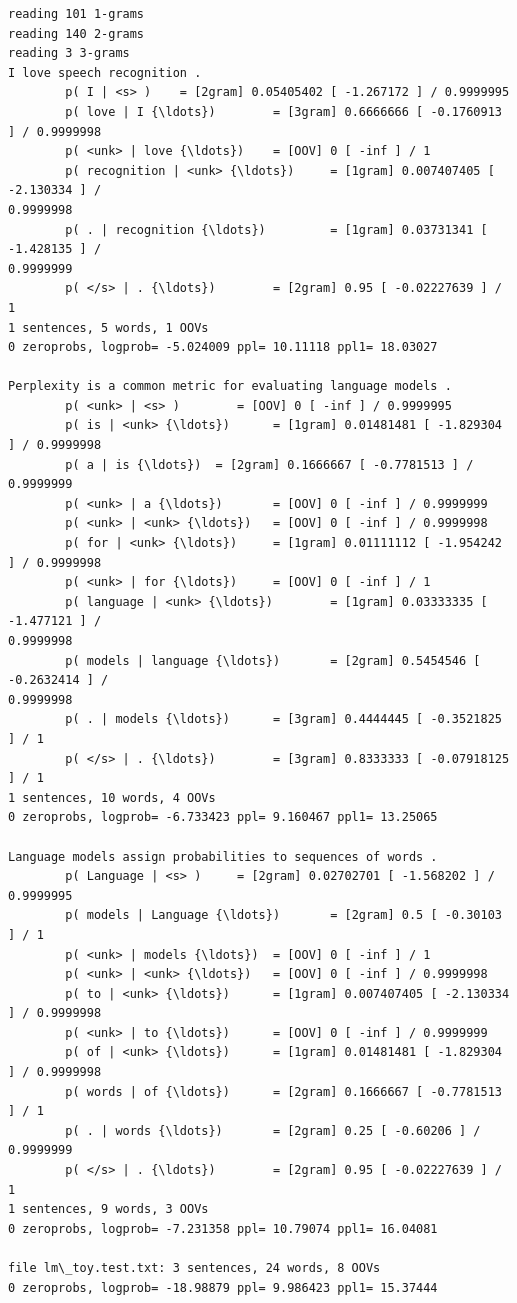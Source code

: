 \documentclass[11pt]{article}
\begin{document}
    \begin{Verbatim}[commandchars=\\\{\}]
reading 101 1-grams
reading 140 2-grams
reading 3 3-grams
I love speech recognition .
        p( I | <s> )    = [2gram] 0.05405402 [ -1.267172 ] / 0.9999995
        p( love | I {\ldots})        = [3gram] 0.6666666 [ -0.1760913 ] / 0.9999998
        p( <unk> | love {\ldots})    = [OOV] 0 [ -inf ] / 1
        p( recognition | <unk> {\ldots})     = [1gram] 0.007407405 [ -2.130334 ] /
0.9999998
        p( . | recognition {\ldots})         = [1gram] 0.03731341 [ -1.428135 ] /
0.9999999
        p( </s> | . {\ldots})        = [2gram] 0.95 [ -0.02227639 ] / 1
1 sentences, 5 words, 1 OOVs
0 zeroprobs, logprob= -5.024009 ppl= 10.11118 ppl1= 18.03027

Perplexity is a common metric for evaluating language models .
        p( <unk> | <s> )        = [OOV] 0 [ -inf ] / 0.9999995
        p( is | <unk> {\ldots})      = [1gram] 0.01481481 [ -1.829304 ] / 0.9999998
        p( a | is {\ldots})  = [2gram] 0.1666667 [ -0.7781513 ] / 0.9999999
        p( <unk> | a {\ldots})       = [OOV] 0 [ -inf ] / 0.9999999
        p( <unk> | <unk> {\ldots})   = [OOV] 0 [ -inf ] / 0.9999998
        p( for | <unk> {\ldots})     = [1gram] 0.01111112 [ -1.954242 ] / 0.9999998
        p( <unk> | for {\ldots})     = [OOV] 0 [ -inf ] / 1
        p( language | <unk> {\ldots})        = [1gram] 0.03333335 [ -1.477121 ] /
0.9999998
        p( models | language {\ldots})       = [2gram] 0.5454546 [ -0.2632414 ] /
0.9999998
        p( . | models {\ldots})      = [3gram] 0.4444445 [ -0.3521825 ] / 1
        p( </s> | . {\ldots})        = [3gram] 0.8333333 [ -0.07918125 ] / 1
1 sentences, 10 words, 4 OOVs
0 zeroprobs, logprob= -6.733423 ppl= 9.160467 ppl1= 13.25065

Language models assign probabilities to sequences of words .
        p( Language | <s> )     = [2gram] 0.02702701 [ -1.568202 ] / 0.9999995
        p( models | Language {\ldots})       = [2gram] 0.5 [ -0.30103 ] / 1
        p( <unk> | models {\ldots})  = [OOV] 0 [ -inf ] / 1
        p( <unk> | <unk> {\ldots})   = [OOV] 0 [ -inf ] / 0.9999998
        p( to | <unk> {\ldots})      = [1gram] 0.007407405 [ -2.130334 ] / 0.9999998
        p( <unk> | to {\ldots})      = [OOV] 0 [ -inf ] / 0.9999999
        p( of | <unk> {\ldots})      = [1gram] 0.01481481 [ -1.829304 ] / 0.9999998
        p( words | of {\ldots})      = [2gram] 0.1666667 [ -0.7781513 ] / 1
        p( . | words {\ldots})       = [2gram] 0.25 [ -0.60206 ] / 0.9999999
        p( </s> | . {\ldots})        = [2gram] 0.95 [ -0.02227639 ] / 1
1 sentences, 9 words, 3 OOVs
0 zeroprobs, logprob= -7.231358 ppl= 10.79074 ppl1= 16.04081

file lm\_toy.test.txt: 3 sentences, 24 words, 8 OOVs
0 zeroprobs, logprob= -18.98879 ppl= 9.986423 ppl1= 15.37444
    \end{Verbatim}
\end{document}
